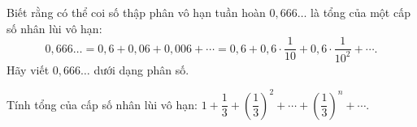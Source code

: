 \begin{bt}%

	Biết rằng có thể coi số thập phân vô hạn tuần hoàn $0{,}666 \ldots$ là tổng của một cấp số nhân lùi vô hạn:
	\[ 0{,}666 \ldots=0{,}6+0{,}06+0{,}006+\cdots=0{,}6+0{,}6 \cdot \dfrac{1}{10}+0{,}6 \cdot \dfrac{1}{10^2}+\cdots.
	\]
	Hãy viết $0{,}666 \ldots$ dưới dạng phân số.
\end{bt}

\begin{bt}%

	Tính tổng của cấp số nhân lùi vô hạn: $1+\dfrac{1}{3}+\left(\dfrac{1}{3}\right)^2+\cdots+\left(\dfrac{1}{3}\right)^n+\cdots$.	
\end{bt}

